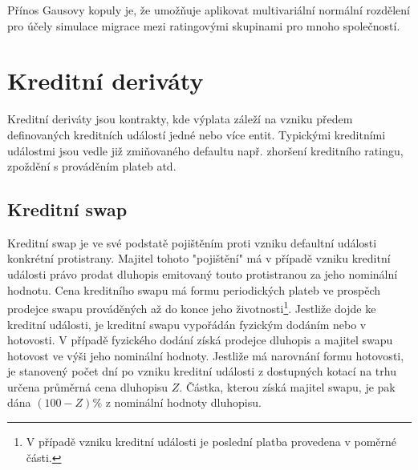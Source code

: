 \documentclass[a4paper]{book}
\begin{document}
Přínos Gausovy kopuly je, že umožňuje aplikovat multivariální normální rozdělení pro účely simulace migrace mezi ratingovými skupinami pro mnoho společností.

\chapter{Kreditní deriváty}

Kreditní deriváty jsou kontrakty, kde výplata záleží na vzniku předem definovaných kreditních událostí jedné nebo více entit. Typickými kreditními událostmi jsou vedle již zmiňovaného defaultu např. zhoršení kreditního ratingu, zpoždění s prováděním plateb atd.

\section{Kreditní swap}

Kreditní swap je ve své podstatě pojištěním proti vzniku defaultní události konkrétní protistrany. Majitel tohoto "pojištění" má v případě vzniku kreditní události právo prodat dluhopis emitovaný touto protistranou za jeho nominální hodnotu. Cena kreditního swapu má formu periodických plateb ve prospěch prodejce swapu prováděných až do konce jeho životnosti\footnote{V případě vzniku kreditní události je poslední platba provedena v poměrné části.}. Jestliže dojde ke kreditní události, je kreditní swapu vypořádán fyzickým dodáním nebo v hotovosti. V případě fyzického dodání získá prodejce dluhopis a majitel swapu hotovost ve výši jeho nominální hodnoty. Jestliže má narovnání formu hotovosti, je stanovený počet dní po vzniku kreditní události z dostupných kotací na trhu určena průměrná cena dluhopisu $Z$. Částka, kterou získá majitel swapu, je pak dána $(100 - Z)\%$ z nominální hodnoty dluhopisu.
\end{document}
